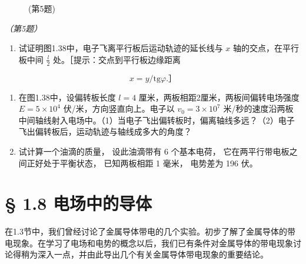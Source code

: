 \begin{figure}
\centering
{}
\caption{(第5题)}
\end{figure}

\emph{（第5题）}

\begin{enumerate}
\def\labelenumi{\arabic{enumi}.}
\setcounter{enumi}{5}
\tightlist
\item
  试证明图1.38中，电子飞离平行板后运动轨迹的延长线与 \(x\)
  轴的交点，在平行板中间 \(\frac{l}{2}\)
  处。［提示：交点到平行板边缘距离
\end{enumerate}

\[
x = y / \mathrm{tg} \varphi . \text{］}
\]

\begin{enumerate}
\def\labelenumi{\arabic{enumi}.}
\setcounter{enumi}{6}
\item
  在图1.38中，设偏转板长度 \(l = 4\)
  厘米，两板相距2厘米，两板间偏转电场强度 \(E = 5 \times 10^{4}\)
  伏/米，方向竖直向上。电子以 \(v_{0} = 3 \times 10^{7}\)
  米/秒的速度沿两板中间轴线射入电场中。（1）当电子飞出偏转板时，偏离轴线多远？（2）电子飞出偏转板后，运动轨迹与轴线成多大的角度？
\item
  试计算一个油滴的质量， 设此油滴带有 6 个基本电荷，
  它在两平行带电板之间正好处于平衡状态， 已知两板相距 1 毫米， 电势差为
  196 伏。
\end{enumerate}

\section{§ 1.8 电场中的导体}\label{ux7535ux573aux4e2dux7684ux5bfcux4f53}

在1.3节中，我们曾经讨论了金属导体带电的几个实验。初步了解了金属导体的带电现象。在学习了电场和电势的概念以后，我们已有条件对金属导体的带电现象讨论得稍为深入一点，并由此导出几个有关金属导体带电现象的重要结论。


